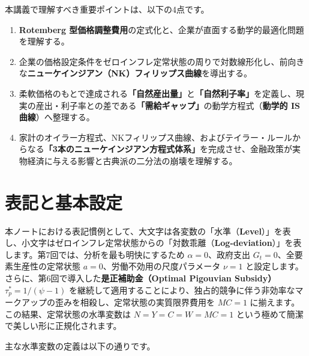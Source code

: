 \documentclass[
  japanese,
  lualatex,
  ja=standard,
  12pt,
  a4paper]{ltjsarticle}
\providecommand{\tightlist}{%
  \setlength{\itemsep}{0pt}\setlength{\parskip}{0pt}}
\begin{document}
\Needspace{0.18\textheight}

本講義で理解すべき重要ポイントは、以下の4点です。

\begin{enumerate}
\def\labelenumi{\arabic{enumi}.}
\tightlist
\item
  \textbf{Rotemberg
  型価格調整費用}の定式化と、企業が直面する動学的最適化問題を理解する。
\item
  企業の価格設定条件をゼロインフレ定常状態の周りで対数線形化し、前向きな\textbf{ニューケインジアン（NK）フィリップス曲線}を導出する。
\item
  柔軟価格のもとで達成される\textbf{「自然産出量」}と\textbf{「自然利子率」}を定義し、現実の産出・利子率との差である\textbf{「需給ギャップ」}の動学方程式（\textbf{動学的
  IS 曲線}）へ整理する。
\item
  家計のオイラー方程式、NKフィリップス曲線、およびテイラー・ルールからなる\textbf{「3本のニューケインジアン方程式体系」}を完成させ、金融政策が実物経済に与える影響と古典派の二分法の崩壊を理解する。
\end{enumerate}

\section{表記と基本設定}\label{ux8868ux8a18ux3068ux57faux672cux8a2dux5b9a}

本ノートにおける表記慣例として、大文字は各変数の「水準（\textbf{Level}）」を表し、小文字はゼロインフレ定常状態からの「対数乖離（\textbf{Log-deviation}）」を表します。第7回では、分析を最も明快にするため
\(\alpha=0\)、政府支出 \(G_t=0\)、全要素生産性の定常状態
\(a=0\)、労働不効用の尺度パラメータ \(\nu=1\)
と設定します。さらに、第6回で導入した\textbf{是正補助金（Optimal
Pigouvian Subsidy）} \(\tau_p^*=1/(\psi-1)\)
を継続して適用することにより、独占的競争に伴う非効率なマークアップの歪みを相殺し、定常状態の実質限界費用を
\(MC=1\) に揃えます。この結果、定常状態の水準変数は \(N=Y=C=W=MC=1\)
という極めて簡潔で美しい形に正規化されます。

主な水準変数の定義は以下の通りです。
\end{document}
